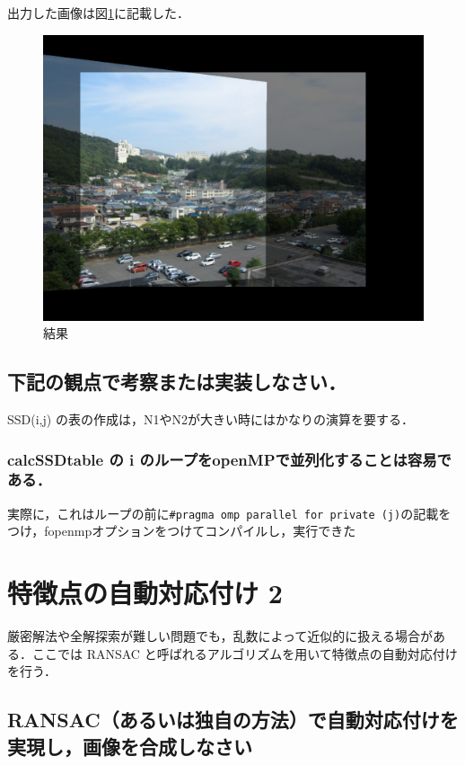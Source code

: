 \documentclass[11pt]{jarticle}
\begin{document}
出力した画像は図\ref{6-1.jpg}に記載した．

\begin{figure}[ht]
    \centering
    \includegraphics[scale=.3]{6-1.jpg}
    \caption{結果}
    \label{6-1.jpg}
\end{figure}

\subsection{下記の観点で考察または実装しなさい．}
SSD(i,j) の表の作成は，N1やN2が大きい時にはかなりの演算を要する．
\subsubsection{calcSSDtable の i のループをopenMPで並列化することは容易である．}

実際に，これはループの前に\verb|#pragma omp parallel for private (j)|の記載をつけ，fopenmpオプションをつけてコンパイルし，実行できた

\section{特徴点の自動対応付け 2}
厳密解法や全解探索が難しい問題でも，乱数によって近似的に扱える場合がある．ここでは RANSAC と呼ばれるアルゴリズムを用いて特徴点の自動対応付けを行う．

\subsection{RANSAC（あるいは独自の方法）で自動対応付けを実現し，画像を合成しなさい}
\end{document}
